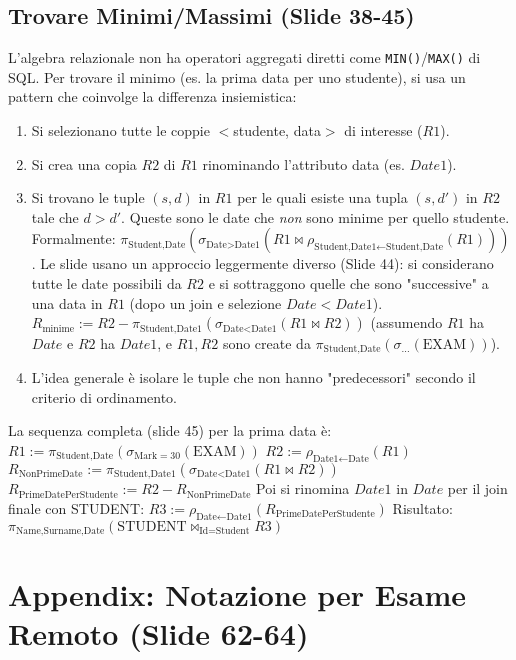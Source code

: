 \subsection{Trovare Minimi/Massimi (Slide 38-45)}
L'algebra relazionale non ha operatori aggregati diretti come \texttt{MIN()}/\texttt{MAX()} di SQL. Per trovare il minimo (es. la prima data per uno studente), si usa un pattern che coinvolge la differenza insiemistica:
\begin{enumerate}
    \item Si selezionano tutte le coppie $<$studente, data$>$ di interesse ($R1$).
    \item Si crea una copia $R2$ di $R1$ rinominando l'attributo data (es. $Date1$).
    \item Si trovano le tuple $(s, d)$ in $R1$ per le quali esiste una tupla $(s, d')$ in $R2$ tale che $d > d'$. Queste sono le date che \textit{non} sono minime per quello studente.
          Formalmente: $\pi_{\text{Student,Date}}(\sigma_{\text{Date}>\text{Date1}}(R1 \Join \rho_{\text{Student,Date1} \leftarrow \text{Student,Date}}(R1)))$.
          Le slide usano un approccio leggermente diverso (Slide 44): si considerano tutte le date possibili da $R2$ e si sottraggono quelle che sono "successive" a una data in $R1$ (dopo un join e selezione $Date < Date1$).
          $R_{\text{minime}} := R2 - \pi_{\text{Student,Date1}}(\sigma_{\text{Date}<\text{Date1}}(R1 \Join R2))$ (assumendo $R1$ ha $Date$ e $R2$ ha $Date1$, e $R1, R2$ sono create da $\pi_{\text{Student,Date}}(\sigma_{\dots}(\text{EXAM}))$).
    \item L'idea generale è isolare le tuple che non hanno "predecessori" secondo il criterio di ordinamento.
\end{enumerate}
La sequenza completa (slide 45) per la prima data è:
$R1 := \pi_{\text{Student,Date}}(\sigma_{\text{Mark}=30}(\text{EXAM}))$
$R2 := \rho_{\text{Date1} \leftarrow \text{Date}}(R1)$
$R_{\text{NonPrimeDate}} := \pi_{\text{Student,Date1}}(\sigma_{\text{Date} < \text{Date1}}(R1 \Join R2))$
$R_{\text{PrimeDatePerStudente}} := R2 - R_{\text{NonPrimeDate}}$
Poi si rinomina $Date1$ in $Date$ per il join finale con STUDENT:
$R3 := \rho_{\text{Date} \leftarrow \text{Date1}}(R_{\text{PrimeDatePerStudente}})$
Risultato: $\pi_{\text{Name,Surname,Date}}(\text{STUDENT} \Join_{\text{Id}=\text{Student}} R3)$\section{Appendix: Notazione per Esame Remoto (Slide 62-64)}
